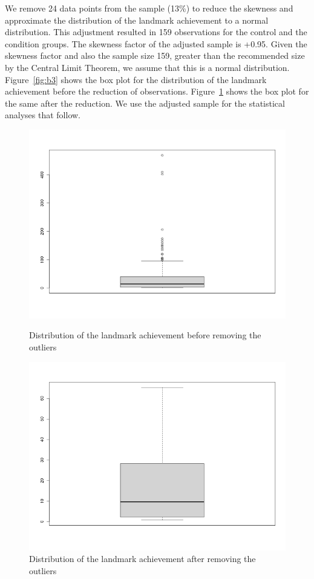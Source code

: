 We remove 24 data points from the sample (13\%) to reduce the skewness and approximate the distribution of the landmark achievement to a normal distribution.
This adjustment resulted in 159 observations for the control and the condition groups.
The skewness factor of the adjusted sample is +0.95.
Given the skewness factor and also the sample size 159, greater than the recommended size by the Central Limit Theorem, we assume that this is a normal distribution.
Figure~\ref{fig:b3} shows the box plot for the distribution of the landmark achievement before the reduction of observations.
Figure~\ref{fig:b4} shows the box plot for the same after the reduction.
We use the adjusted sample for the statistical analyses that follow.

\begin{figure}[tpb]
\centering
	\begin{minipage}[b]{0.46\columnwidth}
	\includegraphics[width=\columnwidth]{img/outliers_ach1.png}
	\caption{Distribution of the landmark achievement before removing the outliers}			
	\label{fig:b3}
	\end{minipage}
	\quad
	\begin{minipage}[b]{0.50\columnwidth}
	\includegraphics[width=\columnwidth]{img/outliers_ach2.png}
	\caption{Distribution of the landmark achievement after removing the outliers}
	\label{fig:b4}
	\end{minipage}
\end{figure}

